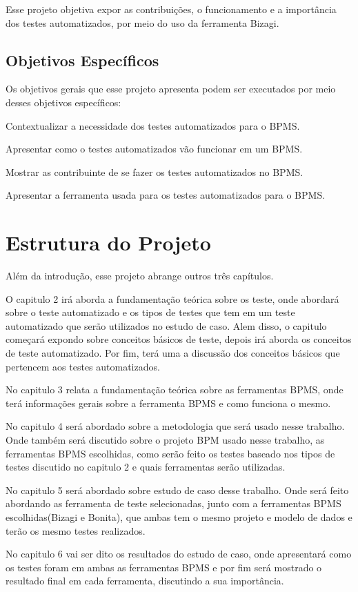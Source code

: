     Esse projeto objetiva expor as contribuições, o funcionamento e a importância dos testes automatizados, por meio do uso da ferramenta Bizagi.
	

\subsection{Objetivos Específicos}
\label{sec:objetivos-especificos}
	Os objetivos gerais que esse projeto apresenta podem ser executados por meio desses objetivos específicos:   
	\begin{alineas}
    	\item Contextualizar a necessidade dos testes automatizados para o BPMS.
		\item Apresentar como o testes automatizados vão funcionar em um BPMS.
		\item Mostrar as contribuinte de se fazer os testes automatizados no BPMS.
		\item Apresentar a ferramenta usada para os testes automatizados para o BPMS.
	\end{alineas}
    
    
\section{Estrutura do Projeto}
\label{sec:Estrutura-do-Projeto}
Além da introdução, esse projeto abrange outros três capítulos.

O capitulo 2 irá aborda a fundamentação teórica sobre os teste, onde abordará sobre o teste automatizado e os tipos de testes que tem em um teste automatizado que serão utilizados no estudo de caso. Alem disso, o capitulo começará expondo sobre conceitos básicos de teste, depois irá aborda os conceitos de teste automatizado. Por fim, terá uma a discussão dos conceitos básicos que pertencem aos testes automatizados.

No capitulo 3 relata a fundamentação teórica sobre as ferramentas BPMS, onde terá informações gerais sobre a ferramenta BPMS e como funciona o mesmo.

No capitulo 4 será abordado sobre a metodologia que será usado nesse trabalho. Onde também será discutido sobre o projeto BPM usado nesse trabalho, as ferramentas BPMS escolhidas, como serão feito os testes baseado nos tipos de testes discutido no capitulo 2 e quais ferramentas serão utilizadas.

No capitulo 5 será abordado sobre  estudo de caso desse trabalho. Onde será feito abordando as ferramenta de teste selecionadas, junto com a ferramentas BPMS escolhidas(Bizagi e Bonita), que ambas tem o mesmo projeto e modelo de dados e terão os mesmo testes realizados.

No capitulo  6 vai ser dito os resultados do estudo de caso, onde apresentará como os testes foram em ambas as ferramentas BPMS e por fim será mostrado o resultado final em cada ferramenta, discutindo a sua importância.

